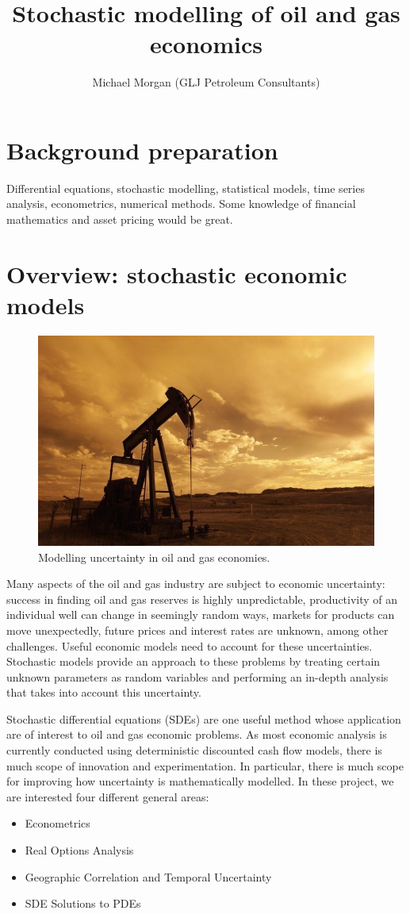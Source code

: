 \documentclass[12pt,a4paper]{article}
\author{Michael Morgan (GLJ Petroleum Consultants)}
\title{Stochastic modelling of oil and gas economics}
\begin{document}
\maketitle

\section{Background preparation}
Differential equations, stochastic modelling, statistical models, time series analysis, econometrics, numerical methods. Some knowledge of financial mathematics and asset pricing would be great. 



\section{Overview: stochastic economic models}

\begin{figure}[h]
\centering
	\includegraphics[width=0.6\linewidth]{oil-pump.jpg}
\caption*{Modelling uncertainty in oil and gas economies.}
\label{fig:oil-pump}
\end{figure}

Many aspects of the oil and gas industry are subject to economic uncertainty: success in finding oil and gas reserves is highly unpredictable, productivity of an individual well can change in seemingly random ways, markets for products can move unexpectedly, future prices and interest rates are unknown, among other challenges. Useful economic models need to account for these uncertainties. Stochastic models provide an approach to these problems by treating certain unknown parameters as random variables and performing an in-depth analysis that takes into account this uncertainty.

Stochastic differential equations (SDEs) are one useful method whose application are of interest to oil and gas economic problems. As most economic analysis is currently conducted using deterministic discounted cash flow models, there is much scope of innovation and experimentation. In particular, there is much scope for improving how uncertainty is mathematically modelled. In these project, we are interested four different general areas:
\begin{itemize}
\item Econometrics
\item Real Options Analysis
\item Geographic Correlation and Temporal Uncertainty
\item SDE Solutions to PDEs
\end{itemize}
\end{document}
